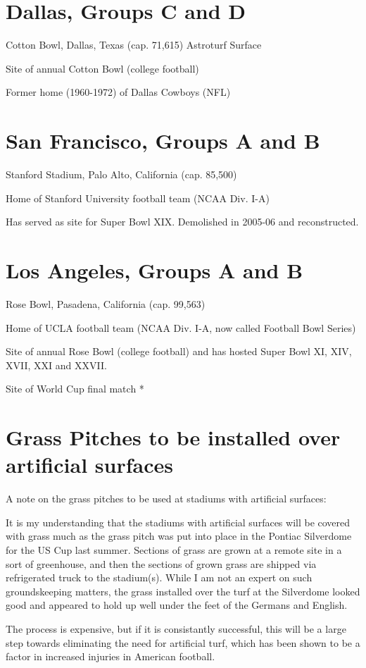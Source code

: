 \section{Dallas, Groups C and D}
Cotton Bowl, Dallas, Texas (cap. 71,615) Astroturf Surface

Site of annual Cotton Bowl (college football)

Former home (1960-1972) of Dallas Cowboys (NFL)
\section{San Francisco, Groups A and B} 
Stanford Stadium, Palo Alto, California (cap. 85,500)

Home of Stanford University football team (NCAA Div. I-A)
 
Has served as site for Super Bowl XIX.  Demolished in 2005-06 and reconstructed.
\section{Los Angeles, Groups A and B} 
Rose Bowl, Pasadena, California (cap. 99,563)

Home of UCLA football team (NCAA Div. I-A, now called Football Bowl Series)

Site of annual Rose Bowl (college football) and has hosted Super Bowl XI, XIV, XVII, XXI and XXVII.

Site of World Cup final match *
\section{Grass Pitches to be installed over artificial surfaces}
A note on the grass pitches to be used at stadiums with artificial surfaces:

It is my understanding that the stadiums with artificial surfaces will be 
covered with grass much as the grass pitch was put into place in the Pontiac 
Silverdome for the US Cup last summer.  Sections of grass are grown at a remote
site in a sort of greenhouse, and then the sections of grown grass are shipped
via refrigerated truck to the stadium(s).  While I am not an expert on such 
groundskeeping matters, the grass installed over the turf at the Silverdome 
looked good and appeared to hold up well under the feet of the Germans and 
English.  

The process is expensive, but if it is consistantly successful, this will be a
large step towards eliminating the need for artificial turf, which has been 
shown to be a factor in increased injuries in American football.

